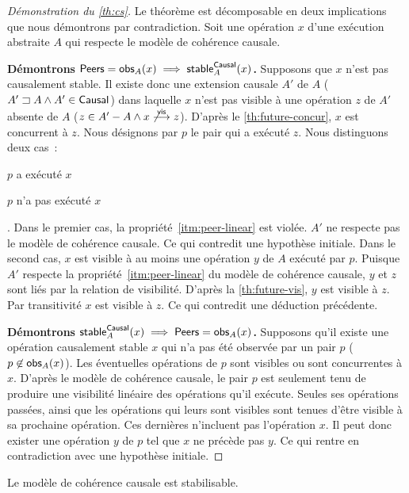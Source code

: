 \begin{proof}[Démonstration du \autoref{th:cs}]
Le théorème est décomposable en deux implications que nous démontrons par contradiction.
Soit une opération $x$ d'une exécution abstraite $A$ qui respecte le modèle de cohérence causale.

\textbf{Démontrons $\operatorname{\mathsf{Peers}} = \operatorname{\mathsf{obs}}_A(x) \implies \operatorname{\mathsf{stable}}_A^{\operatorname{\mathsf{Causal}}}(x)$.}
Supposons que $x$ n'est pas causalement stable.
Il existe donc une extension causale $A'$ de $A$ ($A' \sqsupset A \land A' \in \operatorname{\mathsf{Causal}}$) dans laquelle $x$ n'est pas visible à une opération $z$ de $A'$ absente de $A$ ($z \in A' - A \land x \not\overset{\mathsf{vis}}{\longrightarrow} z$).
D'après le \autoref{th:future-concur}, $x$ est concurrent à $z$.
Nous désignons par $p$ le pair qui a exécuté $z$.
Nous distinguons deux cas~: \begin{inlinelist}
    \item $p$ a exécuté $x$
    \item $p$ n'a pas exécuté $x$
\end{inlinelist}.
Dans le premier cas, la propriété~\ref{itm:peer-linear} est violée.
$A'$ ne respecte pas le modèle de cohérence causale.
Ce qui contredit une hypothèse initiale.
Dans le second cas, $x$ est visible à au moins une opération $y$ de $A$ exécuté par $p$.
Puisque $A'$ respecte la propriété~\ref{itm:peer-linear} du modèle de cohérence causale, $y$ et $z$ sont liés par la relation de visibilité.
D'après la \autoref{th:future-vis}, $y$ est visible à $z$.
Par transitivité $x$ est visible à $z$.
Ce qui contredit une déduction précédente.

\textbf{Démontrons $\operatorname{\mathsf{stable}}_A^{\operatorname{\mathsf{Causal}}}(x) \implies \operatorname{\mathsf{Peers}} = \operatorname{\mathsf{obs}}_A(x)$.}
Supposons qu'il existe une opération causalement stable $x$ qui n'a pas été observée par un pair $p$ ($p \not\in \operatorname{\mathsf{obs}}_A(x)$).
Les éventuelles opérations de $p$ sont visibles ou sont concurrentes à $x$.
D'après le modèle de cohérence causale, le pair $p$ est seulement tenu de produire une visibilité linéaire des opérations qu'il exécute.
Seules ses opérations passées, ainsi que les opérations qui leurs sont visibles sont tenues d'être visible à sa prochaine opération.
Ces dernières n'incluent pas l'opération $x$.
Il peut donc exister une opération $y$ de $p$ tel que $x$ ne précède pas $y$.
Ce qui rentre en contradiction avec une hypothèse initiale.
\end{proof}


\begin{theorem}\label{th:stabilizable-causal}
Le modèle de cohérence causale est stabilisable.
\end{theorem}

